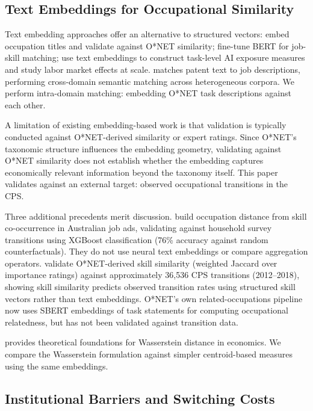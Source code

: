 \documentclass[12pt]{article}
\begin{document}
\subsection{Text Embeddings for Occupational Similarity}

Text embedding approaches offer an alternative to structured vectors: \citet{ZhangEtAl2021} embed occupation titles and validate against O*NET similarity; \citet{DecorteEtAl2022} fine-tune BERT for job-skill matching; \citet{HampoleEtAl2025} use text embeddings to construct task-level AI exposure measures and study labor market effects at scale. \citet{Webb2020} matches patent text to job descriptions, performing cross-domain semantic matching across heterogeneous corpora. We perform intra-domain matching: embedding O*NET task descriptions against each other.

A limitation of existing embedding-based work is that validation is typically conducted against O*NET-derived similarity or expert ratings. Since O*NET's taxonomic structure influences the embedding geometry, validating against O*NET similarity does not establish whether the embedding captures economically relevant information beyond the taxonomy itself. This paper validates against an external target: observed occupational transitions in the CPS.

Three additional precedents merit discussion. \citet{dawson2021skill} build occupation distance from skill co-occurrence in Australian job ads, validating against household survey transitions using XGBoost classification (76\% accuracy against random counterfactuals). They do not use neural text embeddings or compare aggregation operators. \citet{frank2024network} validate O*NET-derived skill similarity (weighted Jaccard over importance ratings) against approximately 36,536 CPS transitions (2012--2018), showing skill similarity predicts observed transition rates using structured skill vectors rather than text embeddings. O*NET's own related-occupations pipeline \cite{onet2024related} now uses SBERT embeddings of task statements for computing occupational relatedness, but has not been validated against transition data.

\citet{Galichon2016} provides theoretical foundations for Wasserstein distance in economics. We compare the Wasserstein formulation against simpler centroid-based measures using the same embeddings.


\subsection{Institutional Barriers and Switching Costs}
\end{document}
